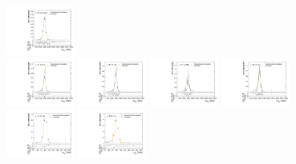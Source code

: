 \begin{figure}[htpb]
  \includegraphics[width=0.2\textwidth]{fig/analysisAppendix/templateVsReco_GbuToWW2000_r0_MVV_mu_LP_nobb_HDy_linear.pdf}\\
  \includegraphics[width=0.2\textwidth]{fig/analysisAppendix/templateVsReco_GbuToWW2000_r0_MVV_mu_HP_vbf_LDy_linear.pdf}
  \includegraphics[width=0.2\textwidth]{fig/analysisAppendix/templateVsReco_GbuToWW2000_r0_MVV_mu_LP_vbf_LDy_linear.pdf}
  \includegraphics[width=0.2\textwidth]{fig/analysisAppendix/templateVsReco_GbuToWW2000_r0_MVV_mu_HP_vbf_HDy_linear.pdf}
  \includegraphics[width=0.2\textwidth]{fig/analysisAppendix/templateVsReco_GbuToWW2000_r0_MVV_mu_LP_vbf_HDy_linear.pdf}\\
  \includegraphics[width=0.2\textwidth]{fig/analysisAppendix/templateVsReco_GbuToWW2000_r0_MJ_mu_HP_bb_LDy.pdf}
  \includegraphics[width=0.2\textwidth]{fig/analysisAppendix/templateVsReco_GbuToWW2000_r0_MJ_mu_LP_bb_LDy.pdf}

\end{figure}
